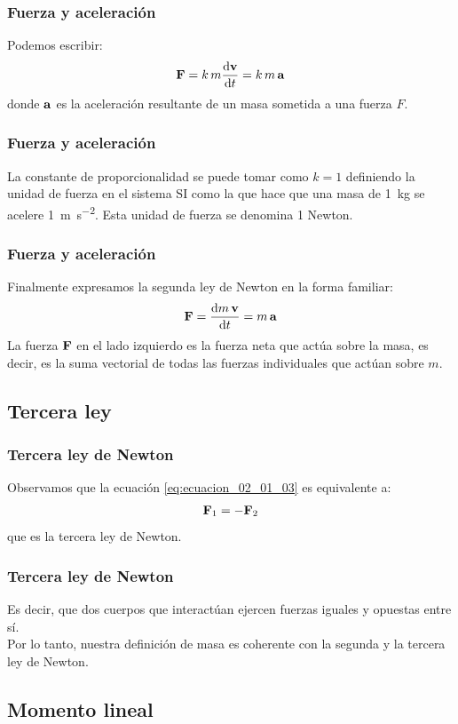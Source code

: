 \documentclass[12pt]{beamer}
\begin{document}
\begin{frame}
\frametitle{Fuerza y aceleración}
Podemos escribir:
\begin{align}
  \vb{F} = k \, m \dv{\vb{v}}{t} = k \, m \, \vb{a}
  \label{eq:ecuacion_02_01_05}
\end{align}
donde $\vb{a}$ es la aceleración resultante de un masa sometida a una fuerza $F$.
\end{frame}
\begin{frame}
\frametitle{Fuerza y aceleración}
La constante de proporcionalidad se puede tomar como $k = 1$ definiendo la unidad de fuerza en el sistema SI como la que hace que una masa de \SI{1}{\kilo\gram} se acelere \SI{1}{\meter\per\square\second}. \pause Esta unidad de fuerza se denomina 1 Newton.
\end{frame}
\begin{frame}
\frametitle{Fuerza y aceleración}
Finalmente expresamos la segunda ley de Newton en la forma familiar:
\begin{align}
\vb{F} = \dv{m \, \vb{v}}{t} =  m \, \vb{a}
\label{eq:ecuacion_02_01_06}
\end{align}
\pause
La fuerza $\vb{F}$ en el lado izquierdo es la fuerza neta que actúa sobre la masa, \pause es decir, es la suma vectorial de todas las fuerzas individuales que actúan sobre $m$.
\end{frame}

\subsection{Tercera ley}

\begin{frame}
\frametitle{Tercera ley de Newton}
Observamos que la ecuación \ref{eq:ecuacion_02_01_03} es equivalente a:
\pause
\begin{align}
  \vb{F}_{1} = - \vb{F}_{2}
  \label{eq:ecuacion_02_01_07}
\end{align}
que es la tercera ley de Newton.
\end{frame}
\begin{frame}
\frametitle{Tercera ley de Newton}
Es decir, que dos cuerpos que interactúan ejercen fuerzas iguales y opuestas entre sí.
\\
\bigskip
\pause
Por lo tanto, nuestra definición de masa es coherente con la segunda y la tercera ley de Newton.
\end{frame}

\subsection{Momento lineal}
\end{document}
